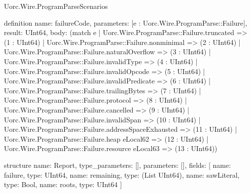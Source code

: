 \begin{lexlean}{Uorc.Wire.ProgramParseScenarios}
\begin{semanticmodule}
definition{
  name: failureCode,
  parameters: [e : Uorc.Wire.ProgramParse::Failure],
  result: UInt64,
  body: (match e
    | Uorc.Wire.ProgramParse::Failure.truncated => (1 : UInt64)
    | Uorc.Wire.ProgramParse::Failure.nonminimal => (2 : UInt64)
    | Uorc.Wire.ProgramParse::Failure.naturalOverflow => (3 : UInt64)
    | Uorc.Wire.ProgramParse::Failure.invalidType => (4 : UInt64)
    | Uorc.Wire.ProgramParse::Failure.invalidOpcode => (5 : UInt64)
    | Uorc.Wire.ProgramParse::Failure.invalidPredicate => (6 : UInt64)
    | Uorc.Wire.ProgramParse::Failure.trailingBytes => (7 : UInt64)
    | Uorc.Wire.ProgramParse::Failure.protocol => (8 : UInt64)
    | Uorc.Wire.ProgramParse::Failure.cancelled => (9 : UInt64)
    | Uorc.Wire.ProgramParse::Failure.invalidSpan => (10 : UInt64)
    | Uorc.Wire.ProgramParse::Failure.addressSpaceExhausted => (11 : UInt64)
    | Uorc.Wire.ProgramParse::Failure.heap eLocal62 => (12 : UInt64)
    | Uorc.Wire.ProgramParse::Failure.resource eLocal63 => (13 : UInt64))
}

structure{
  name: Report,
  type_parameters: [],
  parameters: [],
  fields: [
    {name: failure, type: UInt64},
    {name: remaining, type: (List UInt64)},
    {name: sawLiteral, type: Bool},
    {name: roots, type: UInt64}
  ]
}


\end{semanticmodule}
\end{lexlean}
